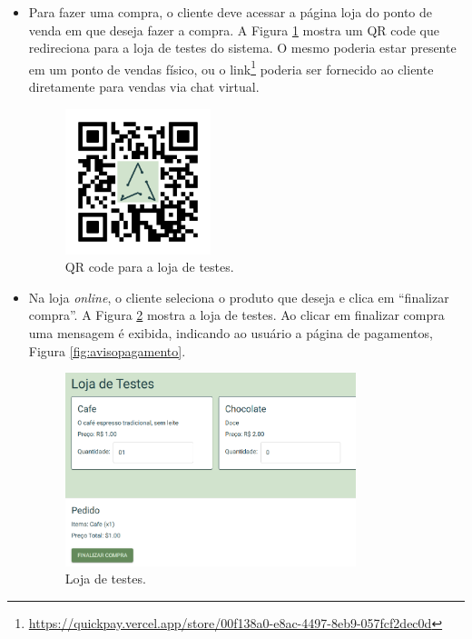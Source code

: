 \begin{itemize}
    \item Para fazer uma compra, o cliente deve acessar a página loja do ponto de venda em que deseja fazer a compra. A Figura \ref{fig:qrstore} mostra um QR code que redireciona para a loja de testes do sistema. O mesmo poderia estar presente em um ponto de vendas físico, ou o link\footnote{\url{https://quickpay.vercel.app/store/00f138a0-e8ac-4497-8eb9-057fcf2dec0d}} poderia ser fornecido ao cliente diretamente para vendas via chat virtual.


    \begin{figure}
    	\caption{\label{fig:qrstore}QR code para a loja de testes.}
    	\begin{center}
    		\includegraphics[width=0.4\textwidth]{figuras/qrcodestore.png}
    	\end{center}
    \end{figure}

    \item Na loja \textit{online}, o cliente seleciona o produto que deseja e clica em ``finalizar compra''. A Figura \ref{fig:testeloja} mostra a loja de testes. Ao clicar em finalizar compra uma mensagem é exibida, indicando ao usuário a página de pagamentos, Figura \ref{fig:avisopagamento}.

    \begin{figure}
    	\caption{\label{fig:testeloja}Loja de testes.}
    	\begin{center}
    		\includegraphics[width=0.8\textwidth]{figuras/testeloja.png}
    	\end{center}
    \end{figure}


\end{itemize}
